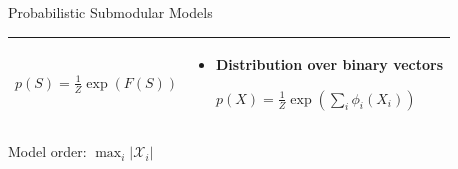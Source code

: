 \documentclass[mathserif]{beamer}
\newcommand{\qboxa}[1]{%
\begin{tcolorbox}[enhanced jigsaw,size=tight,hbox,boxsep=4pt,boxrule=1pt,coltext=textcolor,colframe=col1,opacityback=0,opacityframe=1]
\strut #1
\end{tcolorbox}%
}
\begin{document}
\begin{frame}{Probabilistic Submodular Models}
\begin{tabular}{>{\arraybackslash}p{}>{\arraybackslash}p{}}
\begin{minipage}[t]{\textwidth}
\begin{itemize}
\vspace{1em}
$p(S) = \displaystyle\frac{1}{Z} \exp(F(S))$
\end{itemize}
\end{minipage}
&
\begin{minipage}[t]{\textwidth}
\begin{itemize}
\item Distribution over binary vectors

\vspace{0.3em}
$p(X) = \displaystyle\frac{1}{Z} \exp\left(\sum_i \phi_i(X_i)\right)$
\end{itemize}

\vspace{0.5em}
\end{minipage}\\ \midrule
\end{tabular}

\vspace{0.2em}
\centering
\qboxa{Model order: $\max_i |\mathcal{X}_i|$}
\end{frame}


\end{document}
